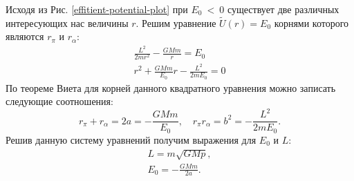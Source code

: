 Исходя из Рис. \ref{effitient-potential-plot} при $E_0~<~0$ существует две различных интересующих нас величины $r$. 
Решим уравнение $\tilde{U}(r) = E_0$ корнями которого являются $r_{\pi}$ и $r_{\alpha}$:
\begin{gather*}
	\frac{L^2}{2mr^2} - \frac{GMm}{r} = E_0 \\
	r^2 + \frac{GMm}{E_0}r - \frac{L^2}{2m E_0} = 0
\end{gather*}
По теореме Виета для корней данного квадратного уравнения можно записать следующие соотношения:
\begin{equation*}
	r_{\pi} + r_{\alpha} = 2a = -\frac{GMm}{E_0}, \quad r_{\pi}r_{\alpha} = b^2 = - \frac{L^2}{2m E_0}.
\end{equation*}
Решив данную систему уравнений получим выражения для $E_0$ и $L$:
\begin{gather}
	L = m \sqrt{GMp}, \\
	E_0 = -\frac{GMm}{2a}.
	\label{eq:total-orbit-energy}
\end{gather}







